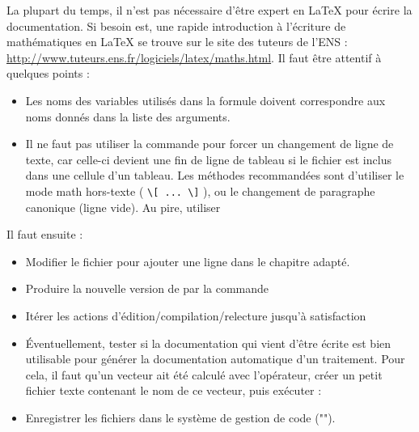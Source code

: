 La plupart du temps, il n'est pas nécessaire d'être expert en
\LaTeX{} pour écrire la documentation. Si besoin est, une
rapide introduction à l'écriture de mathématiques en
\LaTeX{}  se trouve sur le site des tuteurs de l'ENS :
\url{http://www.tuteurs.ens.fr/logiciels/latex/maths.html}.
Il faut être attentif à quelques points :\begin{itemize}
\item Les noms des variables utilisés dans la formule
doivent correspondre aux noms donnés dans la liste des
arguments.
\item Il ne faut pas utiliser la commande 
\clavier{\textbackslash\textbackslash} pour forcer 
un changement de ligne de texte, car celle-ci devient une fin 
de ligne de tableau si le fichier est inclus dans une
cellule d'un tableau. Les méthodes recommandées
sont d'utiliser le mode math hors-texte ( \verb+\[ ... \]+ ),
ou le changement de paragraphe
canonique (ligne vide).
Au pire, utiliser 
\end{itemize}

\noindent Il faut ensuite :\begin{itemize}
 \item Modifier le fichier  pour ajouter 
une ligne \newline
{}
dans le chapitre adapté.
 \item Produire la nouvelle
version de  par la commande \newline
{}
 \item Itérer les actions d'édition/compilation/relecture jusqu'à
  satisfaction
 \item Éventuellement, tester si la documentation qui vient d'être
écrite est bien utilisable pour générer la documentation automatique
d'un traitement. Pour cela, il faut qu'un vecteur ait été calculé
avec l'opérateur, créer un petit fichier texte contenant 
le nom de ce vecteur, puis exécuter :\newline
{}
 \item Enregistrer les fichiers dans le système de gestion 
de code ("").
\end{itemize}
